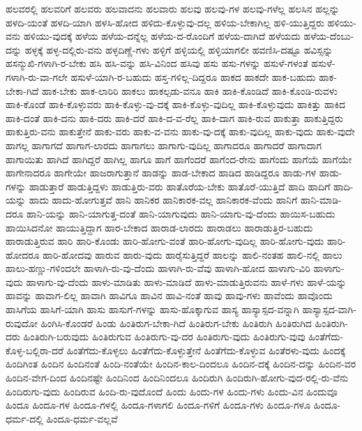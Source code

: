 {ಹಲವರಲ್ಲಿ
ಹಲವರಿಗೆ
ಹಲವರು
ಹಲವಾದನು
ಹಲವಾರು
ಹಲವು
ಹಲವು-ಗಳ
ಹಲವು-ಗಳೆಲ್ಲ
ಹಲಸಿನ
ಹಲ್ಲನ್ನು
ಹಳದಿ-ಯಂತೆ
ಹಳದಿ-ಯಾಗಿ
ಹಳಸಿ-ಹೋದ
ಹಳಿದು-ಕೊಳ್ಳುವು-ದಲ್ಲ
ಹಳಿಯ-ಬೇಕಾಗಿಲ್ಲ
ಹಳಿ-ಯುತ್ತಿದ್ದರು
ಹಳಿಯು-ವನು
ಹಳಿಯು-ವುದಕ್ಕೆ
ಹಳೆಯ
ಹಳೆಯ-ದನ್ನೆಲ್ಲ
ಹಳೆಯ-ದ-ರೊಂದಿಗೆ
ಹಳೆಯ-ದಾಗಿದೆ
ಹಳೆಯದು
ಹಳೆಯ-ದೆಂಬು-ದನ್ನು
ಹಳ್ಳಕ್ಕೆ
ಹಳ್ಳ-ದಲ್ಲಿರು-ವನು
ಹಳ್ಳದಿಣ್ಣೆ-ಗಳು
ಹಳ್ಳಿಗೆ
ಹಳ್ಳಿಯಲ್ಲಿ
ಹಳ್ಳಿಯಾಗಲೀ
ಹವಣಿಸಿ-ದಷ್ಟೂ
ಹವಿಸ್ಸನ್ನು
ಹಸನ್ಮುಖಿ-ಗಳಾಗಿ-ರ-ಬೇಕು
ಹಸಿ
ಹಸಿ-ವನ್ನು
ಹಸಿ-ವಿನಿಂದ
ಹಸಿವು
ಹಸು
ಹಸು-ಗಳನ್ನು
ಹಸುಳೆ-ಗಳಂತೆ
ಹಸುಳೆ-ಗಳಾಗಿ-ರು-ವಾ-ಗಲೇ
ಹಸುಳೆ-ಯಾಗಿ-ರ-ಬಹುದು
ಹಸ್ತ-ಗಳಿಲ್ಲ-ದಿದ್ದರೂ
ಹಾಕದ
ಹಾಕದೇ
ಹಾಕ-ಬಹುದು
ಹಾಕ-ಬೇಕಾ-ಗಿದೆ
ಹಾಕ-ಬೇಕು
ಹಾಕ-ಲಾರಿರಿ
ಹಾಕಲು
ಹಾಕಲ್ಪಡು-ವನೂ
ಹಾಕಿ
ಹಾಕಿ-ಕೊಂಡಿದೆ
ಹಾಕಿ-ಕೊಂಡಿ-ರುವಳು
ಹಾಕಿ-ಕೊಂಡೆ
ಹಾಕಿ-ಕೊಳ್ಳುವರು
ಹಾಕಿ-ಕೊಳ್ಳು-ವು-ದಕ್ಕೆ
ಹಾಕಿ-ಕೊಳ್ಳು-ವುದಿಲ್ಲ
ಹಾಕಿ-ಕೊಳ್ಳುವುದು
ಹಾಕಿತ್ತು
ಹಾಕಿದ
ಹಾಕಿ-ದಂತೆ
ಹಾಕಿ-ದನು
ಹಾಕಿ-ದರು
ಹಾಕಿ-ದರೆ
ಹಾಕಿ-ದ-ವ-ರೆಲ್ಲ
ಹಾಕಿ-ದಾಗ
ಹಾಕಿ-ರುವ
ಹಾಕುತ್ತಾ
ಹಾಕುತ್ತಿದ್ದರು
ಹಾಕುತ್ತಿರು-ವನು
ಹಾಕುತ್ತೇನೆ
ಹಾಕು-ವರು
ಹಾಕು-ವ-ವನು
ಹಾಕು-ವು-ದಕ್ಕೆ
ಹಾಕು-ವುದಿಲ್ಲ
ಹಾಕು-ವುದು
ಹಾಕು-ವುದೇ
ಹಾಗಲ್ಲ
ಹಾಗಾಗದೆ
ಹಾಗಾಗ-ಲಾರದು
ಹಾಗಾಗಲು
ಹಾಗಾಗು-ವುದಿಲ್ಲ
ಹಾಗಾದರೂ
ಹಾಗಾದರೆ
ಹಾಗಾದಾಗ
ಹಾಗಾಯಿತು
ಹಾಗಿದೆ
ಹಾಗಿದ್ದರೆ
ಹಾಗಿಲ್ಲ
ಹಾಗೂ
ಹಾಗೆ
ಹಾಗೆಂದರೆ
ಹಾಗೆಂದ-ರೇನು
ಹಾಗೆಂದು
ಹಾಗೆಯೆ
ಹಾಗೆಯೇ
ಹಾಗೇನಾದರೂ
ಹಾಗೇಯೇ
ಹಾಜರಾಗುತ್ತಾನೆ
ಹಾಡನ್ನು
ಹಾಡ-ಬೇಕಾದ
ಹಾಡಿದ
ಹಾಡಿದ್ದರೂ
ಹಾಡು-ಗಳ
ಹಾಡು-ಗಳನ್ನು
ಹಾಡುತ್ತಾರೆ
ಹಾಡುತ್ತಿದ್ದಳು
ಹಾಡುತ್ತಿರು-ವರು
ಹಾತೊರೆಯ-ಬೇಕು
ಹಾತೊರೆ-ಯುತ್ತಿದೆ
ಹಾದಿ
ಹಾದಿಗೆ
ಹಾದಿ-ಯನ್ನು
ಹಾದು
ಹಾದು-ಹೋಗುತ್ತವೆ
ಹಾನಿ
ಹಾನಿಕರ
ಹಾನಿಕಾರಕ-ವಲ್ಲ
ಹಾನಿಕಾರಕ-ವೆಂದು
ಹಾನಿಗೆ
ಹಾನಿ-ಮಾಡಿ-ದರೂ
ಹಾನಿ-ಯನ್ನು
ಹಾನಿ-ಯಾಗುತ್ತ-ದಂತೆ
ಹಾನಿ-ಯಾಗುವುದು
ಹಾನಿ-ಯಾಗು-ವು-ದೆಂದು
ಹಾಯಿಸ-ಬಹುದು
ಹಾಯಿಸಿದನೋ
ಹಾಯುತ್ತಿದ್ದಾಗ
ಹಾರ-ಬೇಕಾದ
ಹಾರಾಡ-ಲಾರದು
ಹಾರಾಡಲು
ಹಾರಾಡುತ್ತಿರ-ಬಹುದು
ಹಾರಾಡುತ್ತಿರುವ
ಹಾರಿ
ಹಾರಿ-ಕೊಂಡು
ಹಾರಿ-ಹೋಗು-ವಂತೆ
ಹಾರಿ-ಹೋಗು-ವುದಿಲ್ಲ
ಹಾರಿ-ಹೋಗು-ವುದು
ಹಾರಿ-ಹೋದರೂ
ಹಾರಿ-ಹೋದವು
ಹಾರುವ
ಹಾರು-ವುದು
ಹಾರೈಸುತ್ತಿದ್ದರೆ
ಹಾಲನ್ನು
ಹಾಲಿ-ನಂತಹ
ಹಾಲಿ-ನಲ್ಲಿ
ಹಾಲು
ಹಾಲು-ಹಣ್ಣು-ಗಳಿಂದಲೇ
ಹಾಳಾಗಿ-ರು-ವು-ದೆಂದು
ಹಾಳಾಗಿ-ರು-ವೆವು
ಹಾಳಾಗಿ-ಹೋದ
ಹಾಳಾಗು-ವಿರಿ
ಹಾಳಾಗು-ವುದು
ಹಾಳಾಗು-ವು-ದೆಂದು
ಹಾಳು-ಮಾಡಿತು
ಹಾಳು-ಮಾಡಿದೆ
ಹಾಳು-ಮಾಡುತ್ತಿರುವನು
ಹಾಳೆ-ಗಳು
ಹಾಳೆ-ಯನ್ನು
ಹಾವನ್ನು
ಹಾವಾಗ-ಲಿಲ್ಲ
ಹಾವಾಗಿ
ಹಾವಿಗೂ
ಹಾವಿನ
ಹಾವಿ-ನಂತೆ
ಹಾವು
ಹಾವು-ಗಳು
ಹಾವೆಂದು
ಹಾವೊಂದು
ಹಾಸಿಗೆಯ
ಹಾಸಿಗೆ-ಯಾಗಿ
ಹಾಸು
ಹಾಸುಗೆ-ಗಳನ್ನು
ಹಾಸು-ಹೊಕ್ಕಾಗುವ
ಹಾಸ್ಯ
ಹಾಸ್ಯಾಸ್ಪದ-ವನ್ನಾಗಿ
ಹಾಸ್ಯಾಸ್ಪದ-ವಾಗಿ-ರುವುದೋ
ಹಿಂಗಿಸಿ-ಕೊಂಡರೆ
ಹಿಂಡು
ಹಿಂತಿರುಗ-ಬೇಕಾ-ಗಿದೆ
ಹಿಂತಿರುಗ-ಬೇಕು
ಹಿಂತಿರುಗಿ
ಹಿಂತಿರುಗಿದ
ಹಿಂತಿರುಗಿ-ದರು
ಹಿಂತಿರುಗಿ-ಬರುವುದು
ಹಿಂತಿರುಗುವ
ಹಿಂತಿರುಗು-ವು-ದರ
ಹಿಂತಿರುಗು-ವುದು
ಹಿಂತಿರುಗು-ವುವು
ಹಿಂತೆಗೆದು-ಕೊಳ್ಳ-ಬಲ್ಲಿರಾ-ದರೆ
ಹಿಂತೆಗೆದು-ಕೊಳ್ಳಲು
ಹಿಂತೆಗೆದು-ಕೊಳ್ಳುತ್ತೇನೆ
ಹಿಂತೆಗೆದು-ಕೊಳ್ಳುವ
ಹಿಂತೆರಳು-ವುದು
ಹಿಂದಕ್ಕೆ
ಹಿಂದಿಗಿಂತ
ಹಿಂದಿನ
ಹಿಂದಿನಂತೆ
ಹಿಂದಿ-ನಂತೆಯೇ
ಹಿಂದಿನ-ಕಾಲ-ದಿಂದಲೂ
ಹಿಂದಿನ-ದಕ್ಕೆ
ಹಿಂದಿನ-ದನ್ನು
ಹಿಂದಿನ-ವರ
ಹಿಂದಿನ-ವೇಗ-ದಿಂದ
ಹಿಂದಿನಷ್ಟೇ
ಹಿಂದಿನಿಂದ
ಹಿಂದಿನಿಂದಲೂ
ಹಿಂದಿರುಗಿ
ಹಿಂದಿರುಗಿ-ಹೋಗು-ವುದ-ರಲ್ಲಿ-ರು-ವೆನು
ಹಿಂದಿರುಗು-ವುದು
ಹಿಂದಿರುವ
ಹಿಂದಿ-ರು-ವುದೊಂದೆ
ಹಿಂದು
ಹಿಂದು-ಗಳ
ಹಿಂದು-ಗಳು
ಹಿಂದು-ವಿನ
ಹಿಂದುವೂ
ಹಿಂದೂ
ಹಿಂದೂ-ಗಳ
ಹಿಂದೂ-ಗಳಲ್ಲಿ
ಹಿಂದೂ-ಗಳಾಗಲಿ
ಹಿಂದೂ-ಗಳಿಗೆ
ಹಿಂದೂ-ಗಳು
ಹಿಂದೂ-ಗಳೂ
ಹಿಂದೂ-ಧರ್ಮ-ದಲ್ಲಿ
ಹಿಂದೂ-ಧರ್ಮ-ವಲ್ಲವೆ
}
